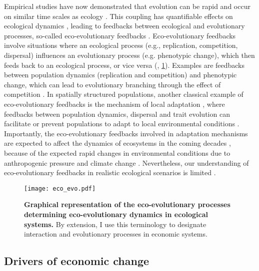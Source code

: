 Empirical studies have now demonstrated that evolution can be rapid and occur on similar time scales as ecology \citep{Hairston2005, Pelletier2009}. This coupling has quantifiable effects on ecological dynamics \citep{Ezard2009}, leading to feedbacks between ecological and evolutionary processes, so-called eco-evolutionary feedbacks \citep{Pelletier2009,Schoener2011,Govaert2019}. 
% 
Eco-evolutionary feedbacks involve situations where an ecological process (e.g., replication, competition, dispersal) influences an evolutionary process (e.g. phenotypic change), which then feeds back to an ecological process, or vice versa (\cite{Govaert2019}, \cref{fig:eco_evo}). Examples are feedbacks between population dynamics (replication and competition) and phenotypic change, which can lead to evolutionary branching through the effect of competition \citep{Dieckmann1999}.
% 
In spatially structured populations, another classical example of eco-evolutionary feedbacks is the mechanism of local adaptation \citep{Savolainen2007}, where feedbacks between population dynamics, dispersal and trait evolution can facilitate or prevent populations to adapt to local environmental conditions \citep{Meszena1997,Doebeli2003}.
% 
Importantly, the eco-evolutionary feedbacks involved in adaptation mechanisms are expected to affect the dynamics of ecosystems in the coming decades \citep{Norberg2012,Urban2016}, because of the expected rapid changes in environmental conditions due to anthropogenic pressure and climate change \citep{Ellis2011,Midgley2019}.
% 
Nevertheless, our understanding of eco-evolutionary feedbacks in realistic ecological scenarios is limited \citep{Lion2022}.

\begin{figure}[ht]
    \centering
    \texttt{[image: eco\_evo.pdf]}
\caption{\textbf{Graphical representation of the eco-evolutionary processes determining eco-evolutionary dynamics in ecological systems.} By extension, I use this terminology to designate interaction and evolutionary processes in economic systems.}
\label{fig:eco_evo}
\end{figure}

\subsection{Drivers of economic change}

